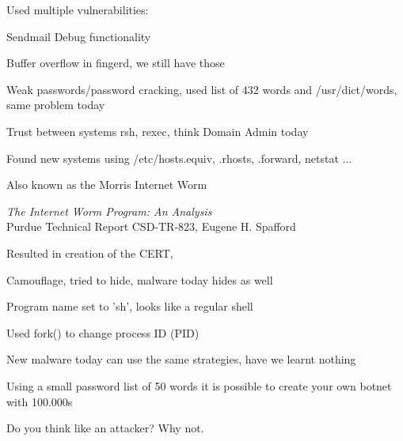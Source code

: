 \documentclass[Screen16to9,17pt,footrule]{foils}
\begin{document}

\begin{list1}
\item Used multiple vulnerabilities:
\begin{list2}
\item Sendmail Debug functionality
\item Buffer overflow in fingerd, we still have those
\item Weak passwords/password cracking, used list of 432 words and /usr/dict/words, same problem today
\item Trust between systems rsh, rexec, think Domain Admin today
\item Found new systems using /etc/hosts.equiv, .rhosts, .forward, netstat ...
\end{list2}
\item Also known as the Morris Internet Worm
\item \emph{The Internet Worm Program: An Analysis}\\
Purdue Technical Report CSD-TR-823, Eugene H. Spafford
\item Resulted in creation of the CERT, 
\end{list1}


\begin{list1}
\item Camouflage, tried to hide, malware today hides as well
\begin{list2}
\item Program name set to 'sh', looks like a regular shell
\item Used fork() to change process ID (PID)
\end{list2}
\item New malware today can use the same strategies, have we learnt nothing
\item Using a small password list of 50 words it is possible to create your own botnet with 100.000s
\end{list1}




\vskip 2cm

\begin{center}

\bf\Large

Do you think like an attacker?
\vskip 5mm
Why not.
\end{center}
\end{document}
